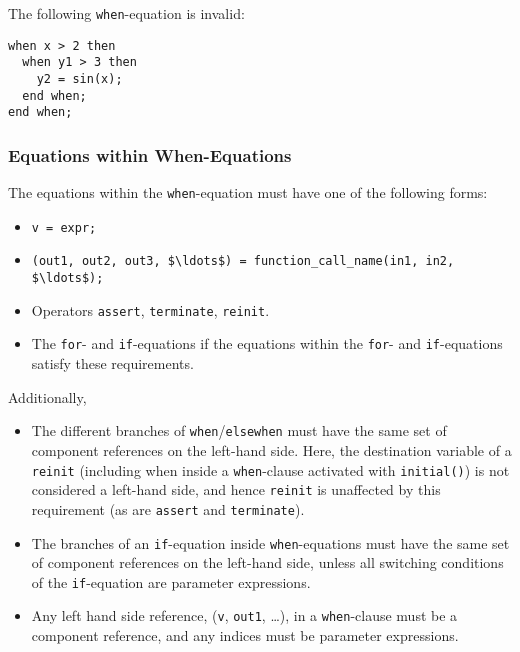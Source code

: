 \begin{example}
The following \lstinline!when!-equation is invalid:
\begin{lstlisting}[language=modelica]
when x > 2 then
  when y1 > 3 then
    y2 = sin(x);
  end when;
end when;
\end{lstlisting}
\end{example}

\subsubsection{Equations within When-Equations}\label{restrictions-on-equations-within-when-equations}\label{equations-within-when-equations}

The equations within the \lstinline!when!-equation must have one of the following forms:
\begin{itemize}
\item
  \lstinline!v = expr;!
\item
  \lstinline!(out1, out2, out3, $\ldots$) = function_call_name(in1, in2, $\ldots$);!
\item
  Operators \lstinline!assert!, \lstinline!terminate!, \lstinline!reinit!.
\item
  The \lstinline!for!- and \lstinline!if!-equations if the equations within the \lstinline!for!- and \lstinline!if!-equations satisfy these requirements.
\end{itemize}
Additionally,
\begin{itemize}
\item
  The different branches of \lstinline!when!/\lstinline!elsewhen! must have the same set of component references on the left-hand side.
  Here, the destination variable of a \lstinline!reinit! (including when inside a \lstinline!when!-clause activated with \lstinline!initial()!) is not considered a left-hand side, and hence \lstinline!reinit! is unaffected by this requirement (as are \lstinline!assert! and \lstinline!terminate!).
\item
  The branches of an \lstinline!if!-equation inside \lstinline!when!-equations must have the same set of component references on the left-hand side, unless all switching conditions of the \lstinline!if!-equation are parameter expressions.
\item
  Any left hand side reference, (\lstinline!v!, \lstinline!out1!, \ldots), in a \lstinline!when!-clause must be a component reference, and any indices must be parameter expressions.
\end{itemize}


